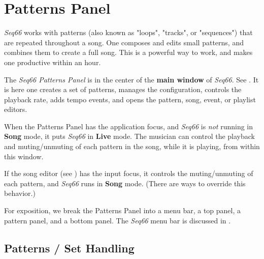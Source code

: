 %
%
%

\section{Patterns Panel}
\label{sec:patterns_panel}

   \textsl{Seq66} works with patterns (also known as "loops", "tracks", or
   "sequences") that are repeated throughout a song.
   One composes and edits small patterns,
   and combines them to create a full song.  This is a powerful way
   to work, and makes one productive within an hour.

   The \textsl{Seq66 Patterns Panel} is in the center of the
   \textbf{main window} of \textsl{Seq66}.
   See .
   It is here one creates a set of patterns,
   manages the configuration, controls the playback rate, adds tempo events,
   and opens the pattern, song, event, or playlist editors.

   When the Patterns Panel has the application focus,
   and \textsl{Seq66} is \textsl{not} running in \textbf{Song} mode,
   it puts \textsl{Seq66} in \textbf{Live} mode.
   The musician can
   control the playback and muting/unmuting of each pattern in
   the song, while it is playing, from within this window.

   If the song editor (see )
   has the input focus, it controls the muting/unmuting of
   each pattern, and \textsl{Seq66} runs in \textbf{Song} mode.
   (There are ways to override this behavior.)

   For exposition, we break the Patterns Panel
   into a menu bar, a top panel, a pattern panel, and a bottom panel.
   The \textsl{Seq66} menu bar is discussed in
   .

\subsection{Patterns / Set Handling}
\label{subsec:patterns_panel_set_handling}


